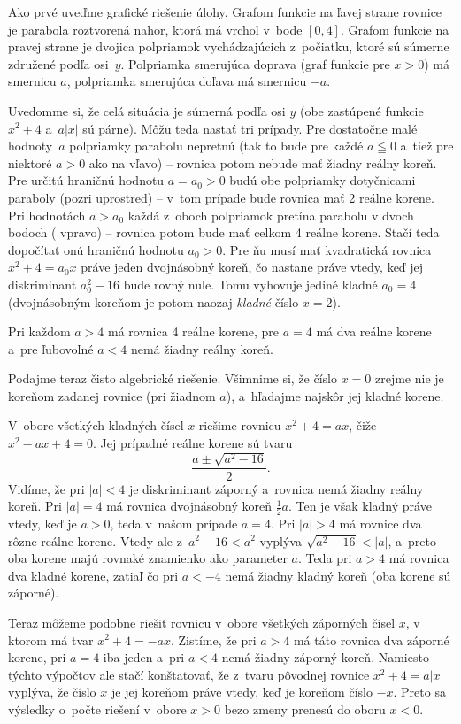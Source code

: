 {%
Ako prvé uveďme grafické riešenie úlohy. Grafom funkcie na ľavej
strane rovnice je parabola roztvorená nahor,
ktorá má vrchol v~bode $[0,4]$.
Grafom funkcie na pravej strane je dvojica polpriamok
vychádzajúcich z~počiatku, ktoré sú súmerne združené podľa
osi~$y$. Polpriamka smerujúca doprava (graf funkcie pre
$x>0$) má smernicu $a$, polpriamka smerujúca doľava má
smernicu ${-a}$.

Uvedomme si, že celá situácia je súmerná
podľa osi $y$ (obe zastúpené funkcie ${x^2+4}$ a~$a|x|$ sú párne). Môžu
teda nastať tri prípady. Pre dostatočne malé hodnoty~$a$ polpriamky
parabolu nepretnú (tak to bude pre každé $a\leqq0$ a~tiež pre
niektoré ${a>0}$ ako na \obr{} vľavo) -- rovnica potom nebude
mať žiadny reálny koreň. Pre určitú hraničnú hodnotu $a=a_0>0$
budú obe polpriamky dotyčnicami paraboly (pozri  uprostred) --
v~tom prípade bude rovnica mať 2 reálne korene. Pri hodnotách
$a>a_0$ každá z~oboch polpriamok pretína parabolu v dvoch bodoch
( vpravo) -- rovnica potom bude mať celkom 4 reálne korene.
Stačí teda dopočítať onú hraničnú hodnotu $a_0>0$.
Pre ňu musí mať kvadratická rovnica $x^2+4=a_0x$ práve jeden
dvojnásobný koreň, čo nastane práve vtedy, keď jej
diskriminant $a_0^2-16$ bude rovný nule. Tomu vyhovuje jediné
kladné $a_0=4$ (dvojnásobným koreňom je potom naozaj \emph{kladné}
číslo $x=2$).
%

\zaver
Pri každom $a>4$ má rovnica 4 reálne korene, pre $a=4$ má dva
reálne korene a~pre ľubovoľné $a<4$ nemá žiadny reálny koreň.


\ineriesenie
Podajme teraz čisto algebrické riešenie. Všimnime si, že číslo $x=0$
zrejme nie je koreňom zadanej rovnice (pri žiadnom $a$),
a~hľadajme najskôr jej kladné korene.

V~obore všetkých kladných čísel $x$ riešime rovnicu $x^2+4=ax$, čiže
$x^2-ax+4=0$. Jej prípadné reálne korene sú tvaru
$$
\frac{a\pm\sqrt{a^2-16}}2.
$$
Vidíme, že pri $|a|<4$ je diskriminant záporný a~rovnica
nemá žiadny reálny koreň. Pri $|a|=4$ má rovnica dvojnásobný
koreň $\frac12a$. Ten je však kladný práve vtedy, keď je
$a>0$, teda v~našom prípade $a=4$. Pri $|a|>4$ má rovnice dva
rôzne reálne korene. Vtedy ale z~$a^2-16<a^2$ vyplýva $\sqrt{a^2-16}<|a|$,
a~preto oba korene majú rovnaké znamienko ako parameter $a$. Teda pri $a>4$
má rovnica dva kladné korene, zatiaľ čo pri $a<-4$ nemá žiadny kladný koreň
(oba korene sú záporné).

Teraz môžeme podobne riešiť rovnicu v~obore všetkých záporných čísel $x$, v
ktorom má tvar $x^2+4={-ax}$. Zistíme, že pri $a>4$ má táto rovnica
dva záporné korene, pri $a=4$ iba jeden a~pri $a<4$ nemá žiadny
záporný koreň. Namiesto týchto výpočtov ale stačí konštatovať, že
z~tvaru pôvodnej rovnice $x^2+4=a|x|$ vyplýva, že číslo $x$ je jej
koreňom práve vtedy, keď je koreňom číslo ${-x}$. Preto sa výsledky
o~počte riešení v~obore $x>0$ bezo zmeny prenesú do oboru $x<0$.

}
